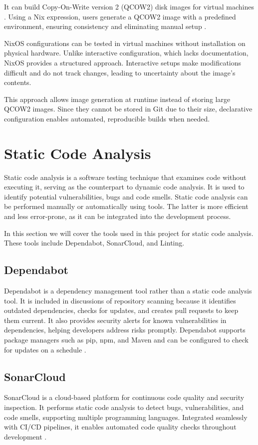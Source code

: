 It can build Copy-On-Write version 2 (QCOW2) disk images for virtual machines \Parencite{nixos_vm_configuration}. Using a Nix expression, users generate a QCOW2 image with a predefined environment, ensuring consistency and eliminating manual setup \Parencite{nix_language_tutorial}.

NixOS configurations can be tested in virtual machines without installation on physical hardware. Unlike interactive configuration, which lacks documentation, NixOS provides a structured approach. Interactive setups make modifications difficult and do not track changes, leading to uncertainty about the image's contents.

This approach allows image generation at runtime instead of storing large QCOW2 images. Since they cannot be stored in Git due to their size, declarative configuration enables automated, reproducible builds when needed.

\section{Static Code Analysis}
Static code analysis is a software testing technique that examines code without executing it, serving as the counterpart to dynamic code analysis. It is used to identify potential vulnerabilities, bugs and code smells. Static code analysis can be performed manually or automatically using tools. The latter is more efficient and less error-prone, as it can be integrated into the development process.

In this section we will cover the tools used in this project for static code analysis. These tools include Dependabot, SonarCloud, and Linting.

\subsection{Dependabot}
Dependabot is a dependency management tool rather than a static code analysis tool. It is included in discussions of repository scanning because it identifies outdated dependencies, checks for updates, and creates pull requests to keep them current. It also provides security alerts for known vulnerabilities in dependencies, helping developers address risks promptly. Dependabot supports package managers such as pip, npm, and Maven and can be configured to check for updates on a schedule \Parencite{GitHubDependabotVersion2025}.

\subsection{SonarCloud}
SonarCloud is a cloud-based platform for continuous code quality and security inspection. It performs static code analysis to detect bugs, vulnerabilities, and code smells, supporting multiple programming languages. Integrated seamlessly with CI/CD pipelines, it enables automated code quality checks throughout development \Parencite{SonarQubeDocs2025}.

